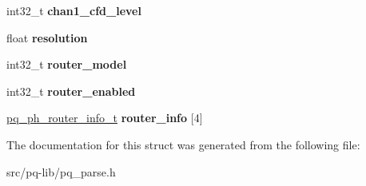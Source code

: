 \begin{DoxyCompactItemize}
\item 
\hypertarget{structpq__ph__board__info__t_a4cbaf2677f69219cd3ac87e41f58e729}{}int32\+\_\+t {\bfseries chan1\+\_\+cfd\+\_\+level}\label{structpq__ph__board__info__t_a4cbaf2677f69219cd3ac87e41f58e729}

\item 
\hypertarget{structpq__ph__board__info__t_ac422ba6836ecb9c79bed4ecd2d6d241a}{}float {\bfseries resolution}\label{structpq__ph__board__info__t_ac422ba6836ecb9c79bed4ecd2d6d241a}

\item 
\hypertarget{structpq__ph__board__info__t_aa7a7131e245b378aa07011bc7c970bf5}{}int32\+\_\+t {\bfseries router\+\_\+model}\label{structpq__ph__board__info__t_aa7a7131e245b378aa07011bc7c970bf5}

\item 
\hypertarget{structpq__ph__board__info__t_af60c63fa96243e8eae0bad2db7ec96f8}{}int32\+\_\+t {\bfseries router\+\_\+enabled}\label{structpq__ph__board__info__t_af60c63fa96243e8eae0bad2db7ec96f8}

\item 
\hypertarget{structpq__ph__board__info__t_af93efd2644823cf22608c0ee191e4368}{}\hyperlink{structpq__ph__router__info__t}{pq\+\_\+ph\+\_\+router\+\_\+info\+\_\+t} {\bfseries router\+\_\+info} \mbox{[}4\mbox{]}\label{structpq__ph__board__info__t_af93efd2644823cf22608c0ee191e4368}

\end{DoxyCompactItemize}


The documentation for this struct was generated from the following file\+:\begin{DoxyCompactItemize}
\item 
src/pq-\/lib/pq\+\_\+parse.\+h\end{DoxyCompactItemize}
